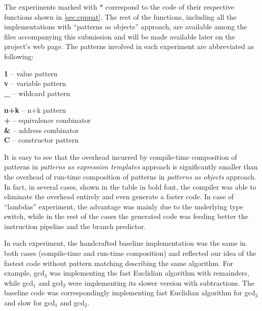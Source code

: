 %
\noindent
The experiments marked with $*$ correspond to the code of their respective 
functions shown in \textsection\ref{sec:cpppat}. The rest of the functions, 
including all the implementations with ``patterns as objects'' approach, are 
available among the files accompanying this submission and will be made 
available later on the project's web page. The patterns involved in each 
experiment are abbreviated as following:

  \begin{minipage}[t]{0.20\textwidth}
      {\bf 1}  -- value pattern    \\
      {\bf v}  -- variable pattern \\
      {\bf \_} -- wildcard pattern
  \end{minipage}
  \begin{minipage}[t]{0.25\textwidth}
      {\bf n+k} -- n+k pattern            \\
      {\bf +}   -- equivalence combinator \\
      {\bf \&}  -- address combinator     \\
      {\bf C}   -- constructor pattern   
  \end{minipage}

\noindent
It is easy to see that the overhead incurred by compile-time composition of 
patterns in \emph{patterns as expression templates} approach is significantly 
smaller than the overhead of run-time composition of patterns in \emph{patterns 
as objects} approach. In fact, in several cases, shown in the table in bold 
font, the compiler was able to eliminate the overhead entirely and even generate 
a faster code. In case of ``lambdas'' experiment, the advantage was mainly due 
to the underlying type switch, while in the rest of the cases the generated code
was feeding better the instruction pipeline and the branch predictor.

In each experiment, the handcrafted baseline implementation was the same in 
both cases (compile-time and run-time composition) and reflected our idea of the 
fastest code without pattern matching describing the same algorithm. For 
example, gcd$_3$ was implementing the fast Euclidian algorithm with remainders, 
while gcd$_1$ and gcd$_2$ were implementing its slower version with 
subtractions. The baseline code was correspondingly implementing fast Euclidian 
algorithm for gcd$_3$ and slow for gcd$_1$ and gcd$_2$.

